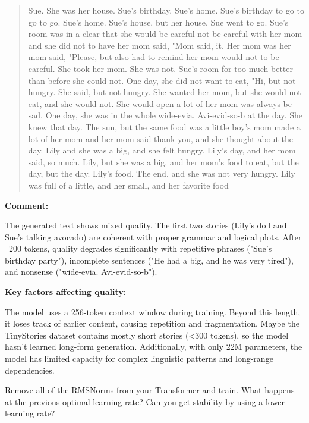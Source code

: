 \begin{answer}
\begin{quote}
Sue. She was her house. Sue's birthday. Sue's home. Sue's birthday to go to go to go. Sue's home. Sue's house, but her house. Sue went to go. Sue's room was in a clear that she would be careful not be careful with her mom and she did not to have her mom said, "Mom said, it. Her mom was her mom said, "Please, but also had to remind her mom would not to be careful. She took her mom. She was not. Sue's room for too much better than before she could not. One day, she did not want to eat, "Hi, but not hungry. She said, but not hungry. She wanted her mom, but she would not eat, and she would not. She would open a lot of her mom was always be sad. One day, she was in the whole wide-evia. Avi-evid-so-b at the day. She knew that day. The sun, but the same food was a little boy's mom made a lot of her mom and her mom said thank you, and she thought about the day. Lily and she was a big, and she felt hungry. Lily's day, and her mom said, so much. Lily, but she was a big, and her mom's food to eat, but the day, but the day. Lily's food. The end, and she was not very hungry. Lily was full of a little, and her small, and her favorite food
\end{quote}

\textbf{Comment:}

The generated text shows mixed quality. The first two stories (Lily's doll and Sue's talking avocado) are coherent with proper grammar and logical plots. After ~200 tokens, quality degrades significantly with repetitive phrases ("Sue's birthday party"), incomplete sentences ("He had a big, and he was very tired"), and nonsense ("wide-evia. Avi-evid-so-b").

\textbf{Key factors affecting quality:}

The model uses a 256-token context window during training. Beyond this length, it loses track of earlier content, causing repetition and fragmentation. Maybe the TinyStories dataset contains mostly short stories (<300 tokens), so the model hasn't learned long-form generation. Additionally, with only 22M parameters, the model has limited capacity for complex linguistic patterns and long-range dependencies.

\end{answer}


Remove all of the RMSNorms from your Transformer and train. What happens at the previous optimal learning rate? Can you get stability by using a lower learning rate?

